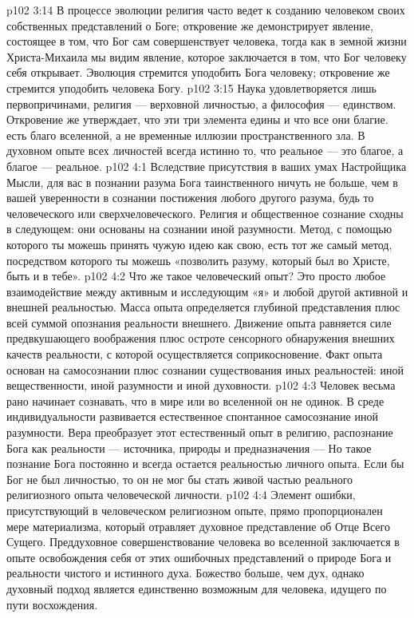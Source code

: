 \vs p102 3:14 В процессе эволюции религия часто ведет к созданию человеком своих собственных представлений о Боге; откровение же демонстрирует явление, состоящее в том, что Бог сам совершенствует человека, тогда как в земной жизни Христа\hyp{}Михаила мы видим явление, которое заключается в том, что Бог человеку себя открывает. Эволюция стремится уподобить Бога человеку; откровение же стремится уподобить человека Богу.
\vs p102 3:15 Наука удовлетворяется лишь первопричинами, религия --- верховной личностью, а философия --- единством. Откровение же утверждает, что эти три элемента едины и что все они благие.  есть благо вселенной, а не временные иллюзии пространственного зла. В духовном опыте всех личностей всегда истинно то, что реальное --- это благое, а благое --- реальное.
\vs p102 4:1 Вследствие присутствия в ваших умах Настройщика Мысли, для вас в познании разума Бога таинственного ничуть не больше, чем в вашей уверенности в сознании постижения любого другого разума, будь то человеческого или сверхчеловеческого. Религия и общественное сознание сходны в следующем: они основаны на сознании иной разумности. Метод, с помощью которого ты можешь принять чужую идею как свою, есть тот же самый метод, посредством которого ты можешь «позволить разуму, который был во Христе, быть и в тебе».
\vs p102 4:2 Что же такое человеческий опыт? Это просто любое взаимодействие между активным и исследующим «я» и любой другой активной и внешней реальностью. Масса опыта определяется глубиной представления плюс всей суммой опознания реальности внешнего. Движение опыта равняется силе предвкушающего воображения плюс остроте сенсорного обнаружения внешних качеств реальности, с которой осуществляется соприкосновение. Факт опыта основан на самосознании плюс сознании существования иных реальностей: иной вещественности, иной разумности и иной духовности.
\vs p102 4:3 Человек весьма рано начинает сознавать, что в мире или во вселенной он не одинок. В среде индивидуальности развивается естественное спонтанное самосознание иной разумности. Вера преобразует этот естественный опыт в религию, распознание Бога как реальности --- источника, природы и предназначения ---  Но такое познание Бога постоянно и всегда остается реальностью личного опыта. Если бы Бог не был личностью, то он не мог бы стать живой частью реального религиозного опыта человеческой личности.
\vs p102 4:4 Элемент ошибки, присутствующий в человеческом религиозном опыте, прямо пропорционален мере материализма, который отравляет духовное представление об Отце Всего Сущего. Преддуховное совершенствование человека во вселенной заключается в опыте освобождения себя от этих ошибочных представлений о природе Бога и реальности чистого и истинного духа. Божество больше, чем дух, однако духовный подход является единственно возможным для человека, идущего по пути восхождения.
